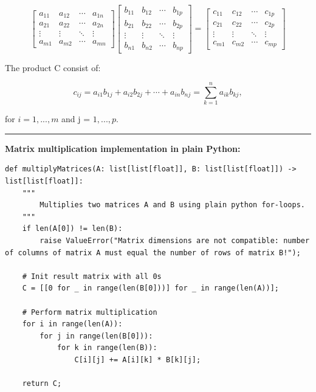 \documentclass[12pt]{article}
\begin{document}
\begin{equation*}
    \begin{bmatrix}
        a_{11} & a_{12} & \cdots & a_{1n} \\
        a_{21} & a_{22} & \cdots & a_{2n} \\
        \vdots & \vdots & \ddots & \vdots \\
        a_{m1} & a_{m2} & \cdots & a_{mn}
    \end{bmatrix}
    \begin{bmatrix}
        b_{11} & b_{12} & \cdots & b_{1p} \\
        b_{21} & b_{22} & \cdots & b_{2p} \\
        \vdots & \vdots & \ddots & \vdots \\
        b_{n1} & b_{n2} & \cdots & b_{np}
    \end{bmatrix}
    =
    \begin{bmatrix}
        c_{11} & c_{12} & \cdots & c_{1p} \\
        c_{21} & c_{22} & \cdots & c_{2p} \\
        \vdots & \vdots & \ddots & \vdots \\
        c_{m1} & c_{m2} & \cdots & c_{mp}
    \end{bmatrix}
\end{equation*}

\noindent The product C consist of:

\begin{equation*}
    c_{ij} = a_{i1}b_{1j} + a_{i2}b_{2j} + \cdots + a_{in}b_{nj} = \sum_{k=1}^{n} a_{ik}b_{kj},
\end{equation*}

\noindent for \( i = 1, ..., m \) and j = \( 1, ..., p \). \\

\noindent\rule{\textwidth}{0.4pt}
\noindent\textbf{Matrix multiplication implementation in plain Python:}
\begin{lstlisting}
def multiplyMatrices(A: list[list[float]], B: list[list[float]]) -> list[list[float]]:
    """
        Multiplies two matrices A and B using plain python for-loops.
    """
    if len(A[0]) != len(B):
        raise ValueError("Matrix dimensions are not compatible: number of columns of matrix A must equal the number of rows of matrix B!");

    # Init result matrix with all 0s
    C = [[0 for _ in range(len(B[0]))] for _ in range(len(A))];

    # Perform matrix multiplication
    for i in range(len(A)):
        for j in range(len(B[0])):
            for k in range(len(B)):
                C[i][j] += A[i][k] * B[k][j];
    
    return C;
\end{lstlisting}
\end{document}
